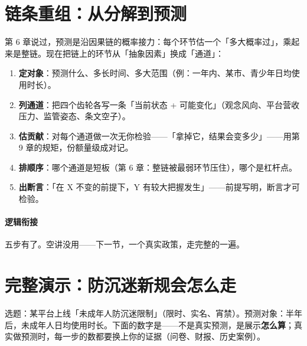 \documentclass[../../main2.tex]{subfiles}
\begin{document}
\section{链条重组：从分解到预测}

第 6 章说过，预测是沿因果链的概率接力：每个环节估一个「多大概率过」，乘起来是整链。现在把链上的环节从「抽象因素」换成「通道」：

\begin{enumerate}
	\item \textbf{定对象}：预测什么、多长时间、多大范围（例：一年内、某市、青少年日均使用时长）。
	\item \textbf{列通道}：把四个齿轮各写一条「当前状态 + 可能变化」（观念风向、平台营收压力、监管姿态、条文空子）。
	\item \textbf{估贡献}：对每个通道做一次无你检验——「拿掉它，结果会变多少」——用第 9 章的规矩，份额量级成对记。
	\item \textbf{排顺序}：哪个通道是短板（第 6 章：整链被最弱环节压住），哪个是杠杆点。
	\item \textbf{出断言}：「在 X 不变的前提下，Y 有较大把握发生」——前提写明，断言才可检验。
\end{enumerate}

\paragraph*{逻辑衔接}
	五步有了。空讲没用——下一节，一个真实政策，走完整的一遍。

\section{完整演示：防沉迷新规会怎么走}

选题：某平台上线「未成年人防沉迷限制」（限时、实名、宵禁）。预测对象：半年后，未成年人日均使用时长。下面的数字是——不是真实预测，是展示\textbf{怎么算}；真实做预测时，每一步的数都要换上你的证据（问卷、财报、历史案例）。
\end{document}
